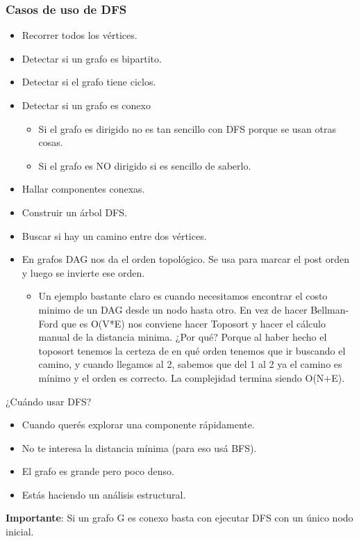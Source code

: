 \documentclass[10pt,a4paper]{article}
\begin{document}
\subsubsection*{Casos de uso de DFS}
\begin{itemize}
    \item Recorrer todos los vértices.
    \item Detectar si un grafo es bipartito.
    \item Detectar si el grafo tiene ciclos. 
    \item Detectar si un grafo es conexo
    \begin{itemize}
        \item Si el grafo es dirigido no es tan sencillo con DFS porque se usan otras cosas.
        \item Si el grafo es NO dirigido si es sencillo de saberlo. 
    \end{itemize}
    \item Hallar componentes conexas.
    \item Construir un árbol DFS. 
    \item Buscar si hay un camino entre dos vértices.
    \item En grafos DAG nos da el orden topológico. Se usa para marcar el post orden y luego se invierte ese orden. 
    \begin{itemize}
        \item Un ejemplo bastante claro es cuando necesitamos encontrar el costo minimo de un DAG desde un nodo hasta otro. En vez de hacer Bellman-Ford que es O(V*E) nos conviene hacer Toposort y hacer el cálculo manual de la distancia minima. ¿Por qué? Porque al haber hecho el toposort tenemos la certeza de en qué orden tenemos que ir buscando el camino, y cuando llegamos al 2, sabemos que del 1 al 2 ya el camino es mínimo y el orden es correcto. La complejidad termina siendo O(N+E).
    \end{itemize}
\end{itemize}
¿Cuándo usar DFS? 
\begin{itemize}
    \item Cuando querés explorar una componente rápidamente.
    \item No te interesa la distancia mínima (para eso usá BFS).
    \item El grafo es grande pero poco denso. 
    \item Estás haciendo un análisis estructural.
\end{itemize}
\textbf{Importante}: Si un grafo G es conexo basta con ejecutar DFS con un único nodo inicial.
\end{document}
